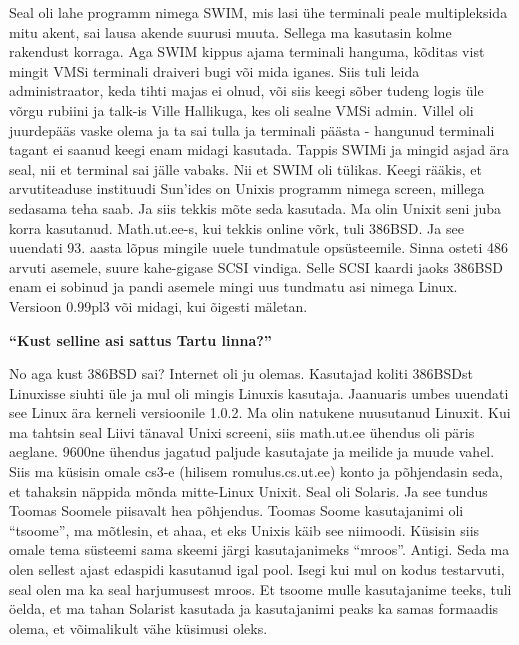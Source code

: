 Seal oli lahe programm nimega SWIM, mis lasi ühe terminali peale multipleksida mitu akent, sai lausa akende suurusi muuta. Sellega ma kasutasin kolme rakendust korraga. Aga SWIM kippus ajama terminali hanguma, kõditas vist mingit VMSi terminali draiveri bugi või mida iganes. Siis tuli leida administraator, keda tihti majas ei olnud, või siis keegi sõber tudeng logis üle võrgu rubiini ja talk-is Ville Hallikuga, kes oli sealne VMSi admin. Villel oli juurdepääs vaske olema ja ta sai tulla ja terminali päästa - hangunud terminali tagant ei saanud keegi enam midagi kasutada. Tappis SWIMi ja mingid asjad ära seal, nii et terminal sai jälle vabaks. Nii et SWIM oli tülikas. Keegi rääkis, et arvutiteaduse instituudi Sun'ides on Unixis programm nimega screen, millega sedasama teha saab. Ja siis tekkis mõte seda kasutada. Ma olin Unixit seni juba korra kasutanud. Math.ut.ee-s, kui tekkis online võrk, tuli 386BSD. Ja see uuendati 93. aasta lõpus mingile uuele tundmatule opsüsteemile. Sinna osteti 486 arvuti asemele, suure kahe-gigase SCSI vindiga. Selle SCSI kaardi jaoks 386BSD enam ei sobinud ja pandi asemele mingi uus tundmatu asi nimega Linux. Versioon 0.99pl3 või midagi, kui õigesti mäletan. 

\textbf{\enquote{Kust selline asi sattus Tartu linna?}} 

No aga kust 386BSD sai? Internet oli ju olemas. Kasutajad koliti 386BSDst Linuxisse siuhti üle ja mul oli mingis Linuxis kasutaja. Jaanuaris umbes uuendati see Linux ära kerneli versioonile 1.0.2. Ma olin natukene nuusutanud Linuxit. Kui ma tahtsin seal Liivi tänaval Unixi screeni, siis math.ut.ee ühendus oli päris aeglane. 9600ne ühendus jagatud paljude kasutajate ja meilide ja muude vahel. Siis ma küsisin omale cs3-e (hilisem romulus.cs.ut.ee) konto ja põhjendasin seda, et tahaksin näppida mõnda mitte-Linux Unixit. Seal oli Solaris. Ja see tundus Toomas Soomele piisavalt hea põhjendus. Toomas Soome kasutajanimi oli \enquote{tsoome}, ma mõtlesin, et ahaa, et eks Unixis käib see niimoodi. Küsisin siis omale tema süsteemi sama skeemi järgi kasutajanimeks \enquote{mroos}. Antigi. Seda ma olen sellest ajast edaspidi kasutanud igal pool. Isegi kui mul on kodus testarvuti, seal olen ma ka seal harjumusest mroos. Et tsoome mulle kasutajanime teeks, tuli öelda, et ma tahan Solarist kasutada ja kasutajanimi peaks ka samas formaadis olema, et võimalikult vähe küsimusi oleks. 

